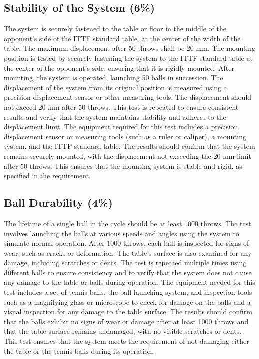 \documentclass[12pt]{article}
\begin{document}
\subsection{Stability of the System (6\%)}
The system is securely fastened to the table or floor in the middle of the opponent’s side of the ITTF standard table, at the center of the width of the table. The maximum displacement after 50 throws shall be 20 mm. The mounting position is tested by securely fastening the system to the ITTF standard table at the center of the opponent's side, ensuring that it is rigidly mounted. After mounting, the system is operated, launching 50 balls in succession. The displacement of the system from its original position is measured using a precision displacement sensor or other measuring tools. The displacement should not exceed 20 mm after 50 throws. This test is repeated to ensure consistent results and verify that the system maintains stability and adheres to the displacement limit. The equipment required for this test includes a precision displacement sensor or measuring tools (such as a ruler or caliper), a mounting system, and the ITTF standard table. The results should confirm that the system remains securely mounted, with the displacement not exceeding the 20 mm limit after 50 throws. This ensures that the mounting system is stable and rigid, as specified in the requirement.
\subsection{Ball Durability (4\%)}
The lifetime of a single ball in the cycle should be at least 1000 throws. The test involves launching the balls at various speeds and angles using the system to simulate normal operation. After 1000 throws, each ball is inspected for signs of wear, such as cracks or deformation. The table's surface is also examined for any damage, including scratches or dents. The test is repeated multiple times using different balls to ensure consistency and to verify that the system does not cause any damage to the table or balls during operation. The equipment needed for this test includes a set of tennis balls, the ball-launching system, and inspection tools such as a magnifying glass or microscope to check for damage on the balls and a visual inspection for any damage to the table surface. The results should confirm that the balls exhibit no signs of wear or damage after at least 1000 throws and that the table surface remains undamaged, with no visible scratches or dents. This test ensures that the system meets the requirement of not damaging either the table or the tennis balls during its operation.
\end{document}
